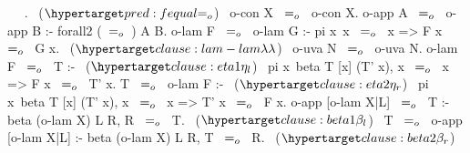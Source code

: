 \begin{elpicode}
  ~  ~.                              ~($\customlabel{pred:fequal}{\Eo}$)~
  o-con X ~$=_o$~ o-con X.
  o-app A ~$=_o$~ o-app B :- forall2 (~$=_o$~) A B.
  o-lam F ~$=_o$~ o-lam G :- pi x\ x ~$=_o$~ x => F x ~$=_o$~ G x.    ~($\customlabel{clause:lam-lam}{\lambda\lambda}$)~
  o-uva N ~$=_o$~ o-uva N.
  o-lam F ~$=_o$~ T :-                                       ~($\customlabel{clause:eta1}{\eta_l}$)~
    pi x\ beta T [x] (T' x), x ~$=_o$~ x => F x ~$=_o$~ T' x.
  T ~$=_o$~ o-lam F :-                                       ~($\customlabel{clause:eta2}{\eta_r}$)~
    pi x\ beta T [x] (T' x), x ~$=_o$~ x => T' x ~$=_o$~ F x.
  o-app [o-lam X|L] ~$=_o$~ T :- beta (o-lam X) L R, R ~$=_o$~ T. ~($\customlabel{clause:beta1}{\beta_l}$)~
  T ~$=_o$~ o-app [o-lam X|L] :- beta (o-lam X) L R, T ~$=_o$~ R. ~($\customlabel{clause:beta2}{\beta_r}$)~
\end{elpicode}
